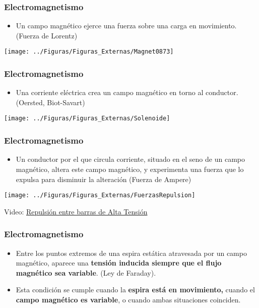 \documentclass[serif, xcolor=dvipsnames]{beamer}
\begin{document}
\begin{frame}
  \frametitle{Electromagnetismo}
  \begin{itemize}
  \item Un campo magnético ejerce una fuerza sobre una carga en
    movimiento.  (Fuerza de Lorentz)
  \end{itemize}
  \begin{center}
    \texttt{[image: ../Figuras/Figuras\_Externas/Magnet0873]}
    \par\end{center}


\end{frame}
\begin{frame}
  \frametitle{Electromagnetismo}
  \begin{itemize}
  \item Una corriente eléctrica crea un campo magnético en torno al
    conductor.  (Oersted, Biot-Savart)
  \end{itemize}
  \begin{center}
    \texttt{[image: ../Figuras/Figuras\_Externas/Solenoide]}
    \par\end{center}


\end{frame}
\begin{frame}
  \frametitle{Electromagnetismo}
  \begin{itemize}
  \item Un conductor por el que circula corriente, situado en el seno
    de un campo magnético, altera este campo magnético, y experimenta
    una fuerza que lo expulsa para disminuir la alteración (Fuerza de
    Ampere)
  \end{itemize}
  \begin{center}
    \texttt{[image: ../Figuras/Figuras\_Externas/FuerzasRepulsion]}
    \par\end{center}
  \begin{block} {}
    \centering Video:
    \href{http://www.youtube.com/watch?v=2j8D_N1v0tU}{Repulsión entre
      barras de Alta Tensión}
  \end{block}

\end{frame}
\begin{frame}
  \frametitle{Electromagnetismo}
  \begin{itemize}
  \item Entre los puntos extremos de una espira estática atravesada
    por un campo magnético, aparece una \textbf{tensión inducida
      siempre que el flujo magnético sea variable}. (Ley de Faraday).
  \item Esta condición se cumple cuando la \textbf{espira está en
      movimiento,} cuando el \textbf{campo magnético es variable}, o
    cuando ambas situaciones coinciden.
  \end{itemize}

\end{frame}
\end{document}
